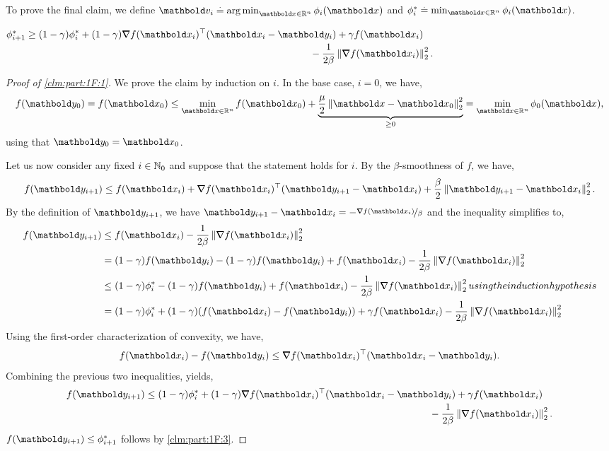 \documentclass{tufte-handout}
\begin{document}
To prove the final claim, we define $\vv_i \defeq \argmin_{\vx \in \R^n} \phi_i(\vx)$ and $\s{\phi_i} \defeq \min_{\vx \in \R^n} \phi_i(\vx)$.

\begin{clm}\label{clm:part:1F:3}
$\s{\phi_{i+1}} \geq \begin{multlined}[t](1-\gamma)\s{\phi_i} + (1-\gamma)\trans{\grad f(\vx_i)}(\vx_i - \vy_i) + \gamma f(\vx_i) \\ - \frac{1}{2\beta}\norm{\grad f(\vx_i)}_2^2.\end{multlined}$
\end{clm}

\begin{proof}[Proof of \cref{clm:part:1F:1}] We prove the claim by induction on $i$. In the base case, $i = 0$, we have, \begin{align*}
    f(\vy_0) = f(\vx_0) \leq \min_{\vx \in \R^n} f(\vx_0) + \underbrace{\frac{\mu}{2}\norm{\vx - \vx_0}_2^2}_{\geq 0} = \min_{\vx \in \R^n} \phi_0(\vx),
\end{align*} using that $\vy_0 = \vx_0$.

Let us now consider any fixed $i \in \mathbb{N}_0$ and suppose that the statement holds for $i$. By the $\beta$-smoothness of $f$, we have, \begin{align*}
    f(\vy_{i+1}) \leq f(\vx_i) + \trans{\grad f(\vx_i)}(\vy_{i+1} - \vx_i) + \frac{\beta}{2}\norm{\vy_{i+1} - \vx_i}_2^2.
\end{align*} By the definition of $\vy_{i+1}$, we have $\vy_{i+1} - \vx_i = - \nicefrac{\grad f(\vx_i)}{\beta}$ and the inequality simplifies to, \begin{align*}
    f(\vy_{i+1}) &\leq f(\vx_i) - \frac{1}{2\beta}\norm{\grad f(\vx_i)}_2^2 \\
    &= (1-\gamma)f(\vy_i) - (1-\gamma)f(\vy_i) + f(\vx_i) - \frac{1}{2\beta}\norm{\grad f(\vx_i)}_2^2 \\
    &\leq (1-\gamma)\s{\phi_i} - (1-\gamma)f(\vy_i) + f(\vx_i) - \frac{1}{2\beta}\norm{\grad f(\vx_i)}_2^2 \margintag{using the induction hypothesis} \\
    &= (1-\gamma)\s{\phi_i} + (1-\gamma)(f(\vx_i) - f(\vy_i)) + \gamma f(\vx_i) - \frac{1}{2\beta}\norm{\grad f(\vx_i)}_2^2
\end{align*} Using the first-order characterization of convexity, we have, \begin{align*}
    f(\vx_i) - f(\vy_i) \leq \trans{\grad f(\vx_i)}(\vx_i - \vy_i).
\end{align*} Combining the previous two inequalities, yields, \begin{align*}
    f(\vy_{i+1}) \leq \begin{multlined}[t]
        (1-\gamma)\s{\phi_i} + (1-\gamma)\trans{\grad f(\vx_i)}(\vx_i - \vy_i) + \gamma f(\vx_i) \\ - \frac{1}{2\beta}\norm{\grad f(\vx_i)}_2^2.
    \end{multlined}
\end{align*} $f(\vy_{i+1}) \leq \s{\phi_{i+1}}$ follows by \cref{clm:part:1F:3}.
\end{proof}
\end{document}

